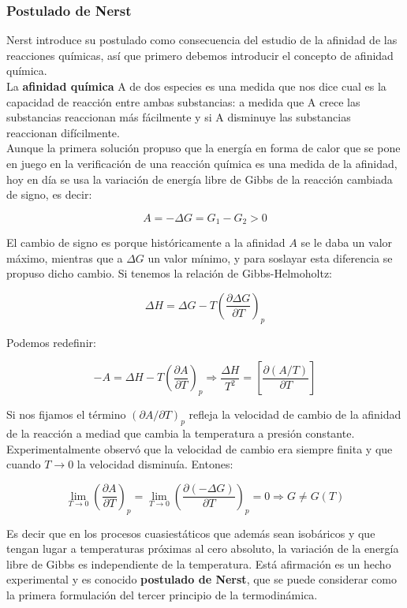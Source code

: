 \documentclass[12pt,a4paper]{article}
\newcommand{\parentesis}[1]{\left( #1 \right)}
\newcommand{\parcialesnormales}[2]{\parentesis{\parciales{ #1}{#2 }}}
\newcommand{\parciales}[2]{\frac{\partial #1}{\partial #2}}
\begin{document}
\subsubsection{Postulado de Nerst}

Nerst introduce su postulado como consecuencia del estudio de la afinidad de las reacciones químicas, así que primero debemos introducir el concepto de afinidad química.  \\

La \textbf{afinidad química} A de dos especies es una medida que nos dice cual es la capacidad de reacción entre ambas substancias: a medida que A crece las substancias reaccionan más fácilmente y si A disminuye las substancias reaccionan difícilmente.  \\

Aunque la primera solución propuso que la energía en forma de calor que se pone en juego en la verificación de una reacción química es una medida de la afinidad, hoy en día se usa la variación de energía libre de Gibbs de la reacción cambiada de signo, es decir:

\begin{equation}
A = - \Delta G = G_1 - G_2 > 0
\end{equation}

El cambio de signo es porque históricamente a la afinidad $A$ se le daba un valor máximo, mientras que a $\Delta G$ un valor mínimo, y para soslayar esta diferencia se propuso dicho cambio. Si tenemos la relación de Gibbs-Helmoholtz:

$$ \Delta H  = \Delta G - T \parcialesnormales{\Delta G}{T}_p  $$ 

Podemos redefinir:

\begin{equation}
- A = \Delta H - T \parcialesnormales{A}{T}_p \Longrightarrow \dfrac{\Delta H}{T^2} = \left[  \parciales{(A/T)}{T} \right]
\end{equation}

Si nos fijamos el término $(\partial A/ \partial T)_p$ refleja la velocidad de cambio de la afinidad de la reacción a mediad que cambia la temperatura a presión constante. Experimentalmente observó que la velocidad de cambio era siempre finita y que cuando $T\rightarrow0$ la velocidad disminuía. Entones:

$$ \lim_{T\rightarrow 0} \parcialesnormales{A}{T}_p  = \lim_{T\rightarrow 0} \parcialesnormales{(-\Delta G)}{T}_p  = 0  \Longrightarrow G \neq G(T) $$

Es decir que en los procesos cuasiestáticos que además sean isobáricos y que tengan lugar a temperaturas próximas al cero absoluto, la variación de la energía libre de Gibbs es independiente de la temperatura. Está afirmación es un hecho experimental y es conocido \textbf{postulado de Nerst}, que se puede considerar como la primera formulación del tercer principio de la termodinámica. \\
\end{document}

